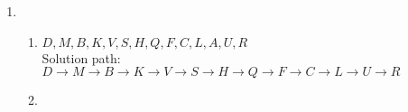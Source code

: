 \documentclass{article}
\begin{document}
\begin{enumerate}
    \item
    \begin{enumerate}
        \item $D, M, B, K, V, S, H, Q, F, C, L, A, U, R$\\
            Solution path: $D{\rightarrow}M{\rightarrow}B{\rightarrow}K{\rightarrow}V{\rightarrow}S{\rightarrow}H{\rightarrow}Q{\rightarrow}F{\rightarrow}C{\rightarrow}L{\rightarrow}U{\rightarrow}R$
        \item
            
    \end{enumerate}
\end{enumerate}
\end{document}
